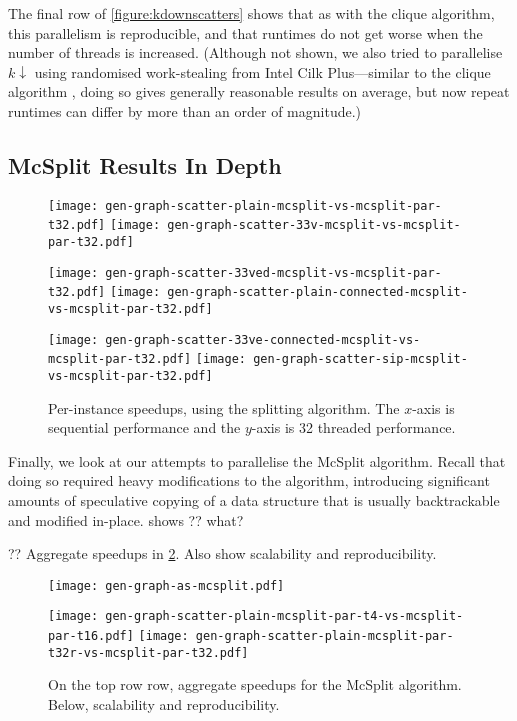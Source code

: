 \documentclass[sigconf]{acmart}
\begin{document}
The final row of \cref{figure:kdownscatters} shows that as with the clique algorithm, this
parallelism is reproducible, and that runtimes do not get worse when the number of threads is
increased. (Although not shown, we also tried to parallelise $k{\downarrow}$ using randomised
work-stealing from Intel Cilk Plus---similar to the clique algorithm
\citep{DBLP:journals/topc/McCreeshP15}, doing so gives generally reasonable results on average, but
now repeat runtimes can differ by more than an order of magnitude.)

\subsection{McSplit Results In Depth}

\begin{figure}[tb]
    \texttt{[image: gen-graph-scatter-plain-mcsplit-vs-mcsplit-par-t32.pdf]}
    \hfill
    \texttt{[image: gen-graph-scatter-33v-mcsplit-vs-mcsplit-par-t32.pdf]}

    \vspace*{1em}

    \texttt{[image: gen-graph-scatter-33ved-mcsplit-vs-mcsplit-par-t32.pdf]}
    \hfill
    \texttt{[image: gen-graph-scatter-plain-connected-mcsplit-vs-mcsplit-par-t32.pdf]}

    \vspace*{1em}

    \texttt{[image: gen-graph-scatter-33ve-connected-mcsplit-vs-mcsplit-par-t32.pdf]}
    \hfill
    \texttt{[image: gen-graph-scatter-sip-mcsplit-vs-mcsplit-par-t32.pdf]}

    \caption{Per-instance speedups, using the splitting algorithm. The $x$-axis is sequential
    performance and the $y$-axis is 32 threaded performance.}\label{figure:mcsplitscatter}
\end{figure}

Finally, we look at our attempts to parallelise the McSplit algorithm. Recall that doing so required
heavy modifications to the algorithm, introducing significant amounts of speculative copying of a
data structure that is usually backtrackable and modified in-place. 
shows ?? what?

?? Aggregate speedups in \cref{figure:mcsplitas}. Also show scalability and reproducibility.

\begin{figure}[tb]
    \texttt{[image: gen-graph-as-mcsplit.pdf]}

    \vspace*{1em}

    \texttt{[image: gen-graph-scatter-plain-mcsplit-par-t4-vs-mcsplit-par-t16.pdf]}
    \hfill
    \texttt{[image: gen-graph-scatter-plain-mcsplit-par-t32r-vs-mcsplit-par-t32.pdf]}

    \caption{On the top row row, aggregate speedups for the McSplit algorithm. Below, scalability
    and reproducibility.}\label{figure:mcsplitas}
\end{figure}
\end{document}
